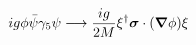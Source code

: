 \begin{equation}
i g \phi \bar{\psi} \gamma_{5} \psi \longrightarrow 
\frac{i g}{2M} \xi^{\dag} \mbox{\boldmath $\sigma$} \cdot (\mbox{\boldmath $\nabla$} \phi)  \xi 
\end{equation}

